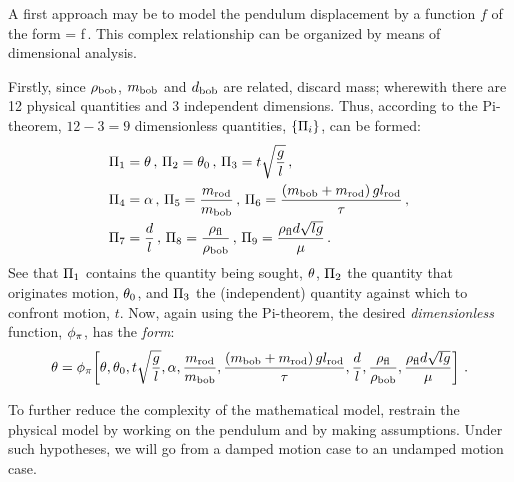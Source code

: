 A first approach may be to model the pendulum displacement by a function $f$ of the form
\beq
\angpos = f\,.
\eeq
This complex relationship can be organized by means of dimensional analysis. 

Firstly, since $\rho_\text{bob}$, $m_\text{bob}$ and $d_\text{bob}$ are related, discard mass; wherewith there are 12 physical quantities and 3 independent dimensions. Thus, according to the Pi-theorem, $12 - 3 = 9$ dimensionless quantities, $\left\lbrace{\Pi_i}\right\rbrace$, can be formed:
\begin{align*}
&\Pi_1 = \theta\,,\,
 \Pi_2 = \theta_0\,,\,
 \Pi_3 = t\sqrt{\dfrac{g}{l}}\,,\,\\
&\Pi_4 = \alpha\,,\,
 \Pi_5 = \dfrac{m_\text{rod}}{m_\text{bob}}\,,\,
 \Pi_6 = \dfrac{\left(m_\text{bob} + m_\text{rod}\right)gl_\text{rod}}{\tau}\,,\,\\
&\Pi_7 = \dfrac{d}{l}\,,\,
 \Pi_8 = \dfrac{\rho_\text{fl}}{\rho_\text{bob}}\,,\,
 \Pi_9 = \dfrac{\rho_\text{fl}d\sqrt{lg}}{\mu}\,.
\end{align*}
See that $\Pi_1$ contains the quantity being sought, $\theta$, $\Pi_2$ the quantity that originates motion, $\theta_0$, and $\Pi_3$ the (independent) quantity against which to confront motion, $t$. Now, again using the Pi-theorem, the desired \emph{dimensionless} function, $\phi_{\pi}$, has the \emph{form}:
\begin{equation}\label{eq:fullgravpendulummodel}
\theta = \phi_{\pi}\!\left[{
            \theta,
            \theta_0,
            t\sqrt{\dfrac{g}{l}},
            \alpha,
            \dfrac{m_\text{rod}}{m_\text{bob}},
            \dfrac{\left(m_\text{bob} + m_\text{rod}\right)gl_\text{rod}}{\tau},
            \dfrac{d}{l},
            \dfrac{\rho_\text{fl}}{\rho_\text{bob}},
            \dfrac{\rho_\text{fl}d\sqrt{lg}}{\mu}
            }\right]\,.
\end{equation}

To further reduce the complexity of the mathematical model, restrain the physical model by working on the pendulum and by making assumptions. Under such hypotheses, we will go from a damped motion case to an undamped motion case.


